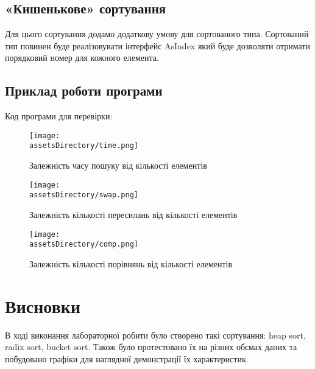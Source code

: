 \newpage
\subsection{«Кишенькове» сортування}
Для цього сортування додамо додаткову умову для сортованого типа.
Сортований тип повинен буде реалізовувати інтерфейс AsIndex який буде дозволяти отримати порядковий номер для кожного елемента.



\newpage
\subsection{Приклад роботи програми}
\noindent
Код програми для перевірки:



\begin{figure}[ht!]
    \centering
    \texttt{[image: \\assetsDirectory/time.png]}
    \caption{Залежність часу пошуку від кількості елементів}
\end{figure}
\begin{figure}[ht!]
    \centering
    \texttt{[image: \\assetsDirectory/swap.png]}
    \caption{Залежність кількості пересилань від кількості елементів}
\end{figure}
\begin{figure}[ht!]
    \centering
    \texttt{[image: \\assetsDirectory/comp.png]}
    \caption{Залежність кількості порівнянь від кількості елементів}
\end{figure}


\newpage
\section{Висновки}
В ході виконання лабораторної робити було створено такі сортування: heap sort, radix sort, bucket sort.
Також було протестовано їх на різних обємах даних та побудовано графіки для наглядної демонстрації їх характеристик.
